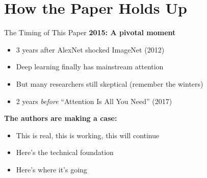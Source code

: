 \section{How the Paper Holds Up}

\begin{frame}{The Timing of This Paper}
    \textbf{2015: A pivotal moment}
    
    \vspace{1em}
    \begin{itemize}
        \item 3 years after AlexNet shocked ImageNet (2012)
        \item Deep learning finally has mainstream attention
        \item But many researchers still skeptical (remember the winters)
        \item 2 years \textit{before} ``Attention Is All You Need'' (2017)
    \end{itemize}
    
    \vspace{1em}
    \textbf{The authors are making a case:}
    \begin{itemize}
        \item This is real, this is working, this will continue
        \item Here's the technical foundation
        \item Here's where it's going
    \end{itemize}
\end{frame}

